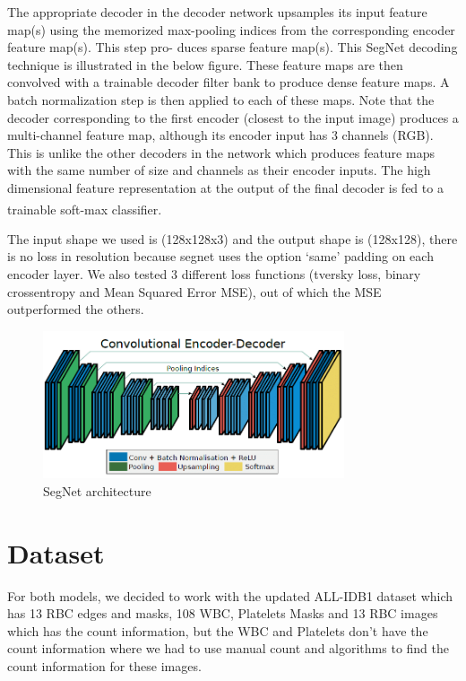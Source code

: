The appropriate decoder in the decoder network upsamples its input feature map(s) using the memorized max-pooling indices from the corresponding encoder feature map(s). This step pro- duces sparse feature map(s). This SegNet decoding technique is illustrated in the below figure.
These feature maps are then convolved with a trainable decoder filter bank to produce dense feature maps. A batch normalization step is then applied to each of these maps. Note that the decoder corresponding to the first encoder (closest to the input image) produces a multi-channel feature map, although its encoder input has 3 channels (RGB).
This is unlike the other decoders in the network which produces feature maps with the same number of size and channels as their encoder inputs. The high dimensional feature representation at the output of the final decoder is fed to a trainable soft-max classifier. \textsuperscript{\cite{badrinarayanan2017segnet}}\

The input shape we used is (128x128x3) and the output shape is (128x128), there is no loss in resolution because segnet uses the option `same' padding on each encoder layer.
We also tested 3 different loss functions (tversky loss, binary crossentropy and Mean Squared Error MSE), out of which the MSE outperformed the others.

\vspace{0.1in}

\begin{figure}[H]
\centering
  \vspace{-0.1in}
    \centerline{\includegraphics[width = 3.5in]{../images/segnet.png}}
    \caption{SegNet architecture}
\end{figure}

\section{Dataset}
\hspace{\parindent}
For both models, we decided to work with the updated ALL-IDB1 dataset which has 13 RBC edges and masks, 108 WBC, Platelets Masks and 13 RBC images which has the count information, but the WBC and Platelets don't have the count information where we had to use manual count and algorithms to find the count information for these images.\

